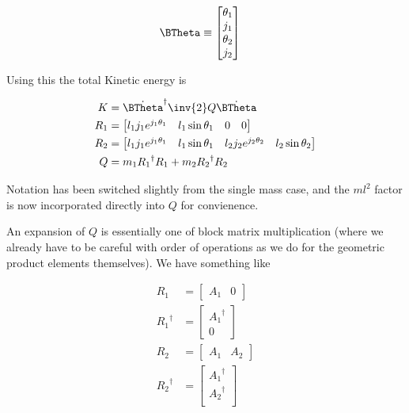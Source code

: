 \begin{align}\label{eqn:sPolarMultiPendulum:zoo11}
\BTheta &\equiv
\begin{bmatrix}
\theta_1 \\ j_1 \\
\theta_2 \\ j_2 \\
\end{bmatrix} 
\end{align}

Using this the total Kinetic energy is

\begin{align}\label{eqn:sPolarMultiPendulum:zoo12}
K &= {\dot{\BTheta}}^\dagger \inv{2} Q \dot{\BTheta} \\
R_1 &=
\begin{bmatrix}
l_1 j_1 e^{j_1\theta_1} & 
l_1 \sin\theta_1 &
0 &
0
\end{bmatrix} \\
R_2 &=
\begin{bmatrix}
 l_1 j_1 e^{j_1\theta_1} & 
 l_1 \sin\theta_1 &
 l_2 j_2 e^{j_2\theta_2} & 
 l_2 \sin\theta_2 
\end{bmatrix} \\
Q &=
m_1 {R_1}^\dagger R_1
+m_2 {R_2}^\dagger R_2
\end{align}

Notation has been switched slightly from the single mass case, and the $m l^2$ factor is now incorporated directly into $Q$ for convienence.

An expansion of $Q$ is essentially one of block matrix multiplication (where we already have to be careful with order of operations as we do for the geometric product elements themselves).  We have something like

\begin{align}\label{eqn:sPolarMultiPendulum:zoo13}
R_1 &= 
\begin{bmatrix}
A_1 & 0
\end{bmatrix} \\
{R_1}^\dagger &= 
\begin{bmatrix}
{A_1}^\dagger \\
0
\end{bmatrix} \\
R_2 &= 
\begin{bmatrix}
A_1 & A_2
\end{bmatrix} \\
{R_2}^\dagger &= 
\begin{bmatrix}
{A_1}^\dagger \\
{A_2}^\dagger \\
\end{bmatrix} 
\end{align}

